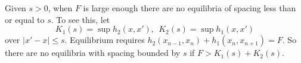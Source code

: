 \documentclass[12pt]{article}
\newcommand{\R}{\mathbb{R}}
\newcommand{\Z}{\mathbb{Z}}
\newcounter{number}
\newtheorem{definition}{Definition}
\newcommand{\begde}{\begin{definition}\hspace{1em}}
\newcommand{\ede}{\end{definition}
                           \addtocounter{number}{1}}
\newcommand{\refer}[1]{~(\ref{#1})}
\newcommand{\xbf}{{\mathbf{x}}}
\newcommand{\ybf}{{\mathbf{y}}}
\begin{document}
Given $s >0$, when $F$ is large enough there are no equilibria of spacing less than or equal to $s$.  To see this, let
$$K_1(s) = \sup h_2(x,x'), \ \ K_2(s) = \sup h_1(x,x')$$
over $|x'-x| \le s$.  Equilibrium requires $h_2(x_{n-1},x_n)+h_1(x_n,x_{n+1}) = F$.  So there are no equilibria with spacing bounded by $s$ if $F > K_1(s)+K_2(s)$.







\end{document}

